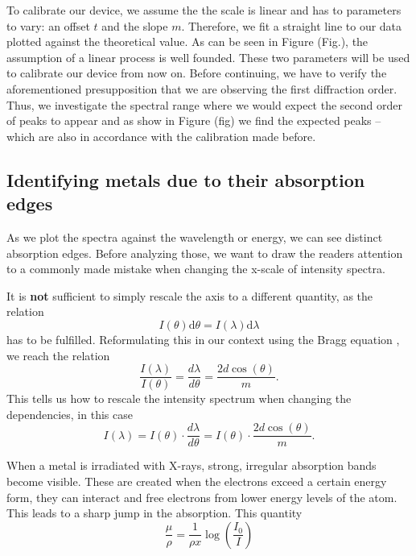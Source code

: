 To calibrate our device, we assume the the scale is linear and has to parameters to vary: an offset $t$ and the slope $m$. Therefore, we 
fit a straight line to our data plotted against the theoretical value. As can be seen in Figure (Fig.), the assumption of a linear process is well founded. 
These two parameters will be used to calibrate our device from now on. Before continuing, we have to verify the aforementioned presupposition that we are observing the first diffraction order.
Thus, we investigate the spectral range where we would expect the second order of peaks to appear and as show in Figure (fig) we find the expected peaks -- which are also in accordance with the calibration made before.


\subsection{Identifying metals due to their absorption edges}

As we plot the spectra against the wavelength or energy, we can see distinct absorption edges. Before analyzing those, 
we want to draw the readers attention to a commonly made mistake when changing the x-scale of intensity spectra.

It is \textbf{not} sufficient to simply rescale the axis to a different quantity, as the relation
\begin{equation*}
    I(\theta) \mathrm{d}\theta = I(\lambda) \mathrm{d}\lambda
\end{equation*}
has to be fulfilled. Reformulating this in our context using the Bragg equation , we reach the relation 
\begin{equation}
    \frac{I(\lambda)}{I(\theta)} = \frac{d \lambda}{d \theta} = \frac{2 d \cos(\theta)}{m}.
\end{equation}
This tells us how to rescale the intensity spectrum when changing the dependencies, in this case 
\begin{equation}
    I(\lambda) = I(\theta) \cdot  \frac{d \lambda}{d \theta} = I(\theta) \cdot \frac{2 d \cos(\theta)}{m} .
\end{equation}

When a metal is irradiated with X-rays, strong, irregular absorption bands become visible. These are created when the electrons exceed a certain energy form, they can interact and
free electrons from lower energy levels of the atom.  This leads to a sharp jump in the absorption.
This quantity
\begin{equation}
    \frac{\mu}{\rho} = \frac{1}{\rho x}\log(\frac{I_0}{I})
\end{equation}

